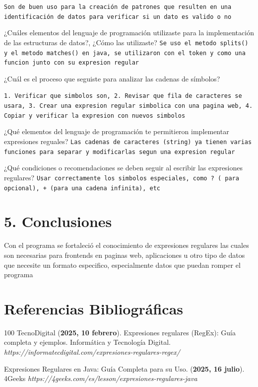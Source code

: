 \documentclass{article}
\begin{document}
 \texttt{Son de buen uso para la creación de patrones que resulten en una
 identificación de datos para verificar si un dato es valido o no}

 
 ¿Cuáles elementos del lenguaje de programación utilizaste para la implementación de las estructuras 
de datos?, ¿Cómo las utilizaste?
\texttt{Se uso el metodo splits() y el metodo matches() en java, se
utilizaron con el token y como una funcion junto con su expresion
regular}



 ¿Cuál es el proceso que seguiste para analizar las cadenas de símbolos? 

\texttt{1. Verificar que simbolos son, 2. Revisar que fila de caracteres se usara, 3. Crear una expresion regular simbolica con una pagina web, 4. Copiar y verificar la expresion con nuevos simbolos}
 
 ¿Qué elementos del lenguaje de programación te permitieron implementar expresiones reguales? 
\texttt{Las cadenas de caracteres (string) ya tienen varias funciones para
separar y modificarlas segun una expresion regular}
 
 ¿Qué condiciones o recomendaciones se deben seguir al escribir las expresiones regulares?
 \texttt{Usar correctamente los simbolos especiales, como ? (
 para opcional), + (para una cadena infinita), etc }
   
    
\section{5. Conclusiones}
   Con el programa se fortaleció el conocimiento de expresiones regulares
   las cuales son necesarias para frontends en paginas web, aplicaciones
   u otro tipo de datos que necesite un formato especifico, especialmente datos que puedan romper el programa
    
    \newpage
    
\section{Referencias Bibliográficas}
    \begin{thebibliography}{100}
TecnoDigital ({\bf 2025, 10 febrero}). Expresiones regulares (RegEx): Guía completa y ejemplos. Informática y Tecnología Digital.
 {\em https://informatecdigital.com/expresiones-regulares-regex/}

Expresiones Regulares en Java: Guía Completa para su Uso. ({\bf 2025, 16 julio}). 4Geeks
 {\em https://4geeks.com/es/lesson/expresiones-regulares-java}
    \end{thebibliography}
\end{document}
